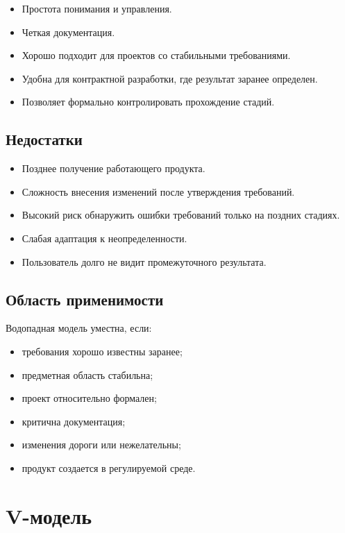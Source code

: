 \documentclass[12pt,a4paper]{article}
\begin{document}
\begin{itemize}
    \item Простота понимания и управления.
    \item Четкая документация.
    \item Хорошо подходит для проектов со стабильными требованиями.
    \item Удобна для контрактной разработки, где результат заранее определен.
    \item Позволяет формально контролировать прохождение стадий.
\end{itemize}

\subsection{Недостатки}

\begin{itemize}
    \item Позднее получение работающего продукта.
    \item Сложность внесения изменений после утверждения требований.
    \item Высокий риск обнаружить ошибки требований только на поздних стадиях.
    \item Слабая адаптация к неопределенности.
    \item Пользователь долго не видит промежуточного результата.
\end{itemize}

\subsection{Область применимости}

Водопадная модель уместна, если:
\begin{itemize}
    \item требования хорошо известны заранее;
    \item предметная область стабильна;
    \item проект относительно формален;
    \item критична документация;
    \item изменения дороги или нежелательны;
    \item продукт создается в регулируемой среде.
\end{itemize}

\section{V-модель}
\end{document}

